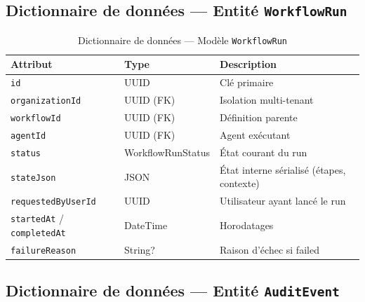 \subsection{Dictionnaire de données — Entité \texttt{WorkflowRun}}

\begin{table}[H]
\centering
\caption{Dictionnaire de données — Modèle \texttt{WorkflowRun}}
\label{tab:dico_run}
\small
\begin{tabularx}{\textwidth}{@{}p{3.6cm}p{2.8cm}X@{}}
\toprule
\textbf{Attribut} & \textbf{Type} & \textbf{Description} \\
\midrule
\texttt{id} & UUID & Clé primaire \\
\rowcolor{rowgray}
\texttt{organizationId} & UUID (FK) & Isolation multi-tenant \\
\texttt{workflowId} & UUID (FK) & Définition parente \\
\rowcolor{rowgray}
\texttt{agentId} & UUID (FK) & Agent exécutant \\
\texttt{status} & WorkflowRunStatus & État courant du run \\
\rowcolor{rowgray}
\texttt{stateJson} & JSON & État interne sérialisé (étapes, contexte) \\
\texttt{requestedByUserId} & UUID & Utilisateur ayant lancé le run \\
\rowcolor{rowgray}
\texttt{startedAt} / \texttt{completedAt} & DateTime & Horodatages \\
\texttt{failureReason} & String? & Raison d'échec si failed \\
\bottomrule
\end{tabularx}
\end{table}

\subsection{Dictionnaire de données — Entité \texttt{AuditEvent}}

